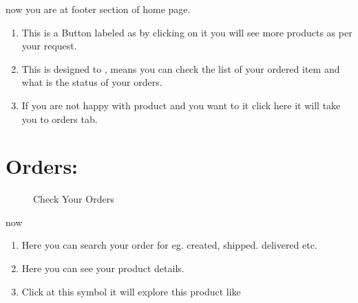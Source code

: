 \documentclass[a4paper,10pt,english]{report}
\begin{document}
now you are at footer section of home page.
\begin{enumerate}
\def\theenumi{\arabic{enumi}}
\def\labelenumi{\theenumi .}
\makeatletter\def\p@enumii{\p@enumi \theenumi .}\makeatother
\setcounter{enumi}{7}
\item {} 
This is a Button labeled as  by clicking on it you will see more products as per your request.

\item {} 
This is designed to  , means you can check the list of your ordered item and what is the status of your orders.

\item {} 
If you are not happy with product and you want to  it click here it will take you to orders tab.

\end{enumerate}


\chapter{Orders:}
\label{\detokenize{index:orders}}\label{\detokenize{index:id9}}
\begin{figure}[htbp]
\centering
\capstart

\noindent{}
\caption{Check Your Orders}\label{\detokenize{index:id19}}\end{figure}

now
\begin{enumerate}
\def\theenumi{\alph{enumi}}
\def\labelenumi{\theenumi .}
\makeatletter\def\p@enumii{\p@enumi \theenumi .}\makeatother
\item {} 
Here you can search your order  for eg. created, shipped. delivered etc.

\item {} 
Here you can see your product details.

\item {} 
Click at this  symbol it will explore this product like

\end{enumerate}
\end{document}
